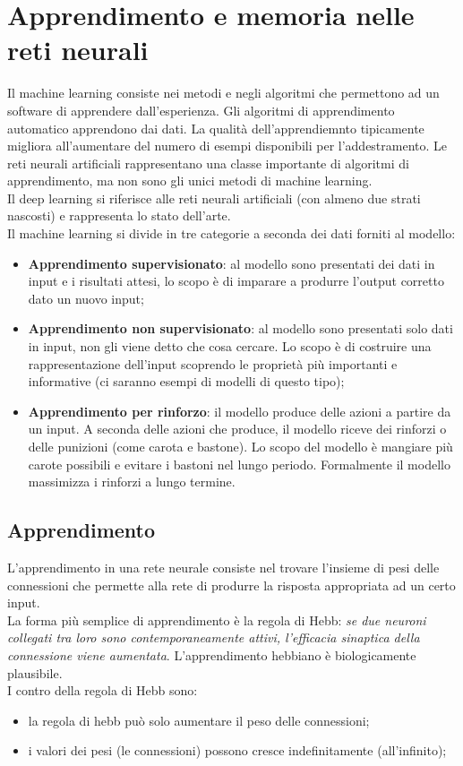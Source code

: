 \section{Apprendimento e memoria nelle reti neurali}

Il machine learning consiste nei metodi e negli algoritmi che permettono ad un
software di apprendere dall'esperienza. Gli algoritmi di apprendimento
automatico apprendono dai dati. La qualità dell'apprendiemnto tipicamente
migliora all'aumentare del numero di esempi disponibili per l'addestramento. Le
reti neurali artificiali rappresentano una classe importante di algoritmi di
apprendimento, ma non sono gli unici metodi di machine learning.\\
Il deep learning si riferisce alle reti neurali artificiali (con almeno due
strati nascosti) e rappresenta lo stato dell'arte.\\
Il machine learning si divide in tre categorie a seconda dei dati forniti al
modello:
\begin{itemize}
\item \textbf{Apprendimento supervisionato}: al modello sono presentati dei dati
in input e i risultati attesi, lo scopo è di imparare a produrre l'output
corretto dato un nuovo input;

\item \textbf{Apprendimento non supervisionato}: al modello sono presentati solo
dati in input, non gli viene detto che cosa cercare. Lo scopo è di costruire una
rappresentazione dell'input scoprendo le proprietà più importanti e informative
(ci saranno esempi di modelli di questo tipo);

\item \textbf{Apprendimento per rinforzo}: il modello produce delle azioni a
partire da un input. A seconda delle azioni che produce, il modello riceve dei
rinforzi o delle punizioni (come carota e bastone). Lo scopo del modello è
mangiare più carote possibili e evitare i bastoni nel lungo periodo. Formalmente
il modello massimizza i rinforzi a lungo termine.
\end{itemize}

\subsection{Apprendimento}

L'apprendimento in una rete neurale consiste nel trovare l'insieme di pesi delle
connessioni che permette alla rete di produrre la risposta appropriata ad un
certo input.\\
La forma più semplice di apprendimento è la regola di Hebb: \textit{se due
neuroni collegati tra loro sono contemporaneamente attivi, l'efficacia sinaptica
della connessione viene aumentata}. L'apprendimento hebbiano è biologicamente
plausibile.\\
I contro della regola di Hebb sono:
\begin{itemize}
\item la regola di hebb può solo aumentare il peso delle connessioni;
\item i valori dei pesi (le connessioni) possono cresce indefinitamente
(all'infinito);
\end{itemize}

